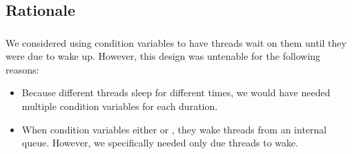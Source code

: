 \subsection{Rationale}
	\subsubsection{}
		We considered using condition variables to have threads wait on them until they were due to wake up. However, this design was untenable for the following reasons:\begin{itemize}
			\item Because different threads sleep for different times, we would have needed multiple condition variables for each duration.
			\item When condition variables either  or , they wake threads from an internal queue. However, we specifically needed only due threads to wake.
		\end{itemize}
